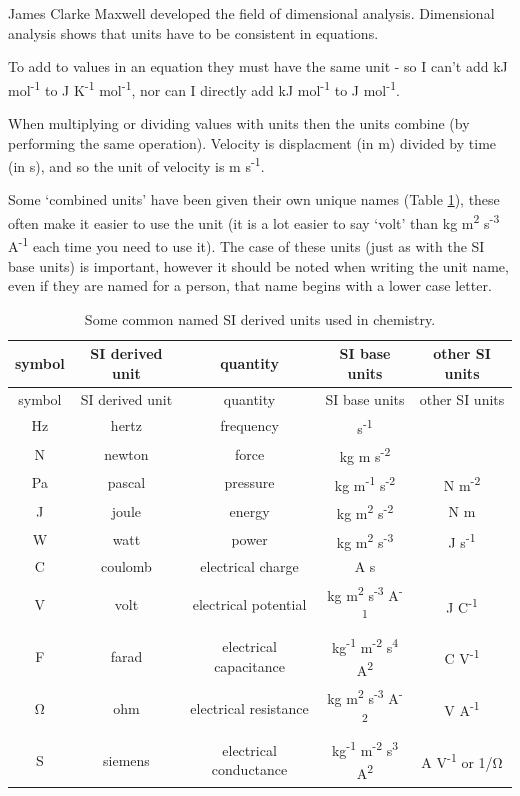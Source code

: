 \documentclass[
]{book}
\begin{document}
James Clarke Maxwell developed the field of dimensional analysis. Dimensional analysis shows that units have to be consistent in equations.

To add to values in an equation they must have the same unit - so I can't add kJ mol\textsuperscript{-1} to J K\textsuperscript{-1} mol\textsuperscript{-1}, nor can I directly add kJ mol\textsuperscript{-1} to J mol\textsuperscript{-1}.

When multiplying or dividing values with units then the units combine (by performing the same operation). Velocity is displacment (in m) divided by time (in s), and so the unit of velocity is m s\textsuperscript{-1}.

Some `combined units' have been given their own unique names (Table \ref{tab:SIderive}), these often make it easier to use the unit (it is a lot easier to say `volt' than kg m\textsuperscript{2} s\textsuperscript{-3} A\textsuperscript{-1} each time you need to use it). The case of these units (just as with the SI base units) is important, however it should be noted when writing the unit name, even if they are named for a person, that name begins with a lower case letter.

\begin{longtable}[]{@{}ccccc@{}}
\caption{\label{tab:SIderive} Some common named SI derived units used in chemistry.}\tabularnewline
\toprule
symbol & SI derived unit & quantity & SI base units & other SI units \\
\midrule
\endfirsthead
\toprule
symbol & SI derived unit & quantity & SI base units & other SI units \\
\midrule
\endhead
Hz & hertz & frequency & s\textsuperscript{-1} & \\
N & newton & force & kg m s\textsuperscript{-2} & \\
Pa & pascal & pressure & kg m\textsuperscript{-1} s\textsuperscript{-2} & N m\textsuperscript{-2} \\
J & joule & energy & kg m\textsuperscript{2} s\textsuperscript{-2} & N m \\
W & watt & power & kg m\textsuperscript{2} s\textsuperscript{-3} & J s\textsuperscript{-1} \\
C & coulomb & electrical charge & A s & \\
V & volt & electrical potential & kg m\textsuperscript{2} s\textsuperscript{-3} A\textsuperscript{-1} & J C\textsuperscript{-1} \\
F & farad & electrical capacitance & kg\textsuperscript{-1} m\textsuperscript{-2} s\textsuperscript{4} A\textsuperscript{2} & C V\textsuperscript{-1} \\
Ω & ohm & electrical resistance & kg m\textsuperscript{2} s\textsuperscript{-3} A\textsuperscript{-2} & V A\textsuperscript{-1} \\
S & siemens & electrical conductance & kg\textsuperscript{-1} m\textsuperscript{-2} s\textsuperscript{3} A\textsuperscript{2} & A V\textsuperscript{-1} or 1/Ω \\
\bottomrule
\end{longtable}
\end{document}
